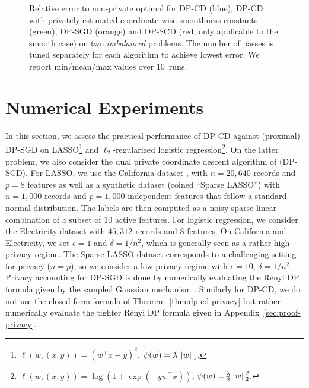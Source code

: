\begin{figure}[t]
  \caption{ Relative error to non-private optimal for DP-CD (blue), DP-CD with
  privately estimated coordinate-wise smoothness
    constants (green), DP-SGD (orange) and DP-SCD (red, only applicable to the
    smooth case) on
    two \emph{imbalanced} problems. The number of passes is
    tuned separately for each algorithm to achieve lowest error. We report
    min/mean/max values over 10~runs.}
  \label{fig:expe-raw}
\end{figure}

\section{Numerical Experiments}
\label{sec:numerical-experiments}


In this section, we assess the practical performance of DP-CD against
(proximal) DP-SGD on LASSO\footnote{\ie
  $\ell(w, (x,y)) = (w^\top x - y)^2$, $\psi(w) = \lambda\left \lVert w \right \rVert_1$.}
and $\ell_2$-regularized logistic regression\footnote{\ie
  $\ell(w, (x, y)) = \log(1 + \exp(-y w^\top x))$,
  $\psi(w) = \!\frac{\lambda}{2}\!\left \lVert w \right \rVert_2^2$.}. On the latter
problem, we also consider the dual private coordinate
descent algorithm of \citet{damaskinos2021Differentially}
(DP-SCD). For LASSO, we use the California dataset
\citep{kelleypace1997Sparse}, with $n=20,640$ records and $p=8$
features as well as a synthetic dataset (coined ``Sparse LASSO'') with
$n=1,000$ records and $p=1,000$ independent features that follow a
standard normal distribution.  The labels are then computed as a noisy
sparse linear combination of a subset of $10$ active features.  For
logistic regression, we consider the Electricity dataset
\citep{Electricity} with $45,312$ records and $8$ features.  On
California and Electricity, we set $\epsilon=1$ and $\delta=1/n^2$,
which is generally seen as a rather high privacy regime. The Sparse
LASSO dataset corresponds to a challenging setting for privacy
($n=p$), so we consider a low privacy regime with $\epsilon=10$,
$\delta=1/n^2$.  Privacy accounting for DP-SGD is done by numerically
evaluating the Rényi DP formula given by the sampled Gaussian
mechanism \citep{mironov2019Enyi}. Similarly for DP-CD, we do not use
the closed-form formula of Theorem~\ref{thm:dp-cd-privacy} but rather
numerically evaluate the tighter Rényi DP formula given in
Appendix~\ref{sec:proof-privacy}.

